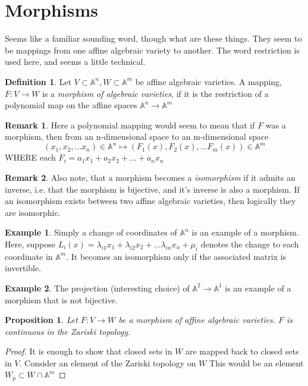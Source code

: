 \documentclass[12pt]{book}
\newtheorem{proposition}{Proposition}[section]
\theoremstyle{definition}
\newtheorem*{defn}{Definition}
\newtheorem{eg}{Example}[chapter]
\newtheorem*{rem}{Remark}
\begin{document}
\section{Morphisms}
Seems like a familiar sounding word, though what are these things. They seem to be mappings from one affine algebraic variety to another. The word restriction is used here, and seems a little technical.

\begin{defn}
    Let $V \subset \mathbb{A}^n, W \subset \mathbb{A}^m$ be affine algebraic varieties. A mapping, $F: V \to W$ is a \textit{morphism of algebraic varieties}, if it is the restriction of a polynomial map on the affine spaces $\mathbb{A}^n \to \mathbb{A}^m$
\end{defn}
\begin{rem}
    Here a polynomial mapping would seem to mean that if $F$ was a morphism, then from an n-dimensional space to an m-dimensional space 
    $$ (x_1, x_2, \ldots x_n) \in \mathbb{A}^n \mapsto (F_1(x), F_2(x), \ldots F_m(x)) \in \mathbb{A}^m $$
    WHERE each $F_i = a_1x_1 + a_2x_2 + \ldots + a_nx_n$
\end{rem}
\begin{rem}
    Also note, that a morphism becomes a \textit{isomorphism} if it admits an inverse, i.e. that the morphism is bijective, and it's inverse is also a morphism. If an isomorphism exists between two affine algebraic varieties, then logically they are isomorphic.
\end{rem}
\begin{eg}
    Simply a change of coordinates of $\mathbb{A}^n$ is an example of a morphism. Here, suppose $L_i(x) = \lambda_{i1}x_1 + \lambda_{i2}x_2 + \ldots \lambda_{in}x_n + \mu_i$ denotes the change to each coordinate in $\mathbb{A}^m$. It becomes an isomorphism only if the associated matrix is invertible.
\end{eg}
\begin{eg}
    The projection (interesting choice) of $\mathbb{A}^2 \to \mathbb{A}^1$ is an example of a morphism that is not bijective.
\end{eg}
\begin{proposition}
    Let $F: V \to W$ be a morphism of affine algebraic varieties. $F$ is continuous in the Zariski topology.
\end{proposition}
\begin{proof}
    It is enough to show that closed sets in $W$ are mapped back to closed sets in $V$.
    Consider an element of the Zariski topology on $W$ This would be an element $W_p \subset W \cap \mathbb{A}^m$
\end{proof}
\end{document}
